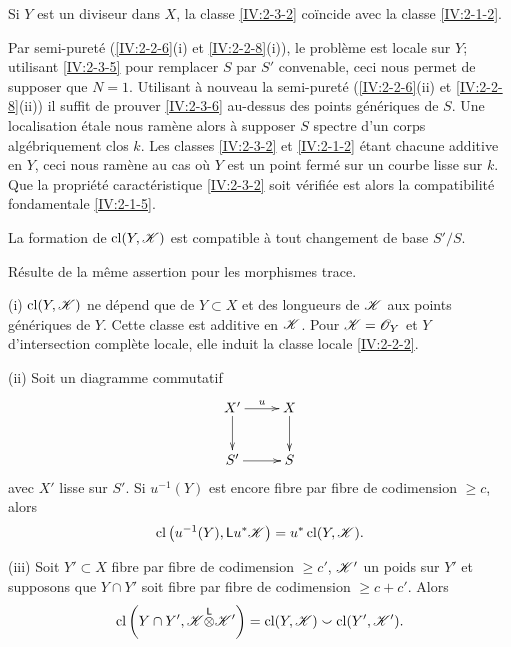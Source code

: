 \begin{lemma}\label{IV:2-3-6}
Si $Y$ est un diviseur dans $X$, la classe \ref{IV:2-3-2} coïncide avec la 
classe \ref{IV:2-1-2}. 
\end{lemma}

Par semi-pureté (\ref{IV:2-2-6}(i) et \ref{IV:2-2-8}(i)), le problème est 
locale sur $Y$; utilisant \ref{IV:2-3-5} pour remplacer $S$ par $S'$ 
convenable, ceci nous permet de supposer que $N=1$. Utilisant à nouveau la 
semi-pureté (\ref{IV:2-2-6}(ii) et \ref{IV:2-2-8}(ii)) il suffit de prouver 
\ref{IV:2-3-6} au-dessus des points génériques de $S$. Une localisation 
étale nous ramène alors à supposer $S$ spectre d'un corps 
algébriquement clos $k$. Les classes \ref{IV:2-3-2} et \ref{IV:2-1-2} étant 
chacune additive en $Y$, ceci nous ramène au cas où $Y$ est un point 
fermé sur un courbe lisse sur $k$. Que la propriété caractéristique 
\ref{IV:2-3-2} soit vérifiée est alors la compatibilité fondamentale 
\ref{IV:2-1-5}. 





\begin{lemma}\label{IV:2-3-7}
La formation de $\operatorname{cl}(Y,\mathscr{K})$ est compatible à tout changement de base 
$S'/S$.
\end{lemma}

Résulte de la même assertion pour les morphismes trace.





\begin{theorem}\label{IV:2-3-8}
(i) $\operatorname{cl}(Y,\mathscr{K})$ ne dépend que de $Y\subset X$ et des longueurs de $\mathscr{K}$ aux 
points génériques de $Y$. Cette classe est additive en $\mathscr{K}$. Pour 
$\mathscr{K}=\mathscr{O}_Y$ et $Y$ d'intersection complète locale, elle induit la classe 
locale \ref{IV:2-2-2}.

(ii) Soit un diagramme commutatif 
\[\xymatrix{
  X' \ar[r]^-u \ar[d] 
    & X \ar[d] \\
  S' \ar[r] 
    & S
}\]
avec $X'$ lisse sur $S'$. Si $u^{-1}(Y)$ est encore fibre par fibre de 
codimension $\geqslant c$, alors 
\[
  \operatorname{cl}\left(u^{-1}(Y),\mathsf{L} u^\ast\mathscr{K}\right) = u^\ast \operatorname{cl}(Y,\mathscr{K}) \text{.}
\]

(iii) Soit $Y'\subset X$ fibre par fibre de codimension $\geqslant c'$, 
$\mathscr{K}'$ un poids sur $Y'$ et supposons que $Y\cap Y'$ soit fibre par fibre de 
codimension $\geqslant c+c'$. Alors 
\[
\operatorname{cl}\left(Y\cap Y',\mathscr{K}{\overset{\mathsf{L}}{\otimes}} \mathscr{K}'\right) = \operatorname{cl}(Y,\mathscr{K}) \smallsmile \operatorname{cl}(Y',\mathscr{K}') \text{.}
\]
\end{theorem}



